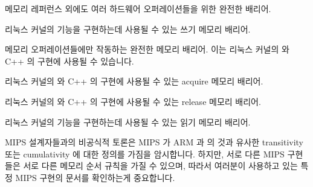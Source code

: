 \begin{description}[style=nextline]
\item[\tco{SYNC}]
	메모리 레퍼런스 외에도 여러 하드웨어 오퍼레이션들을 위한 완전한 배리어.

\item[\tco{SYNC_WMB}]
	리눅스 커널의  기능을 구현하는데 사용될 수 있는 쓰기
	메모리 배리어.

\item[\tco{SYNC_MB}]
	메모리 오퍼레이션들에만 작동하는 완전한 메모리 배리어.
	이는 리눅스 커널의  와 C++
	 의 구현에 사용될 수
	있습니다.

\item[\tco{SYNC_ACQUIRE}]
	리눅스 커널의  와 C++
	 의 구현에 사용될
	수 있는 acquire 메모리 배리어.

\item[\tco{SYNC_RELEASE}]
	리눅스 커널의  와 C++
	 의 구현에 사용될
	수 있는 release 메모리 배리어.

\item[\tco{SYNC_RMB}]
	리눅스 커널의  기능을 구현하는데 사용될 수 있는 읽기
	메모리 배리어.

\end{description}

MIPS 설계자들과의 비공식적 토론은 MIPS 가 ARM 과 \Power{} 의 것과 유사한
transitivity 또는 cumulativity 에 대한 정의를 가짐을 암시합니다.
하지만, 서로 다른 MIPS 구현들은 서로 다른 메모리 순서 규칙을 가질 수 있으며,
따라서 여러분이 사용하고 있는 특정 MIPS 구현의 문서를 확인하는게 중요합니다.
\iffalse

